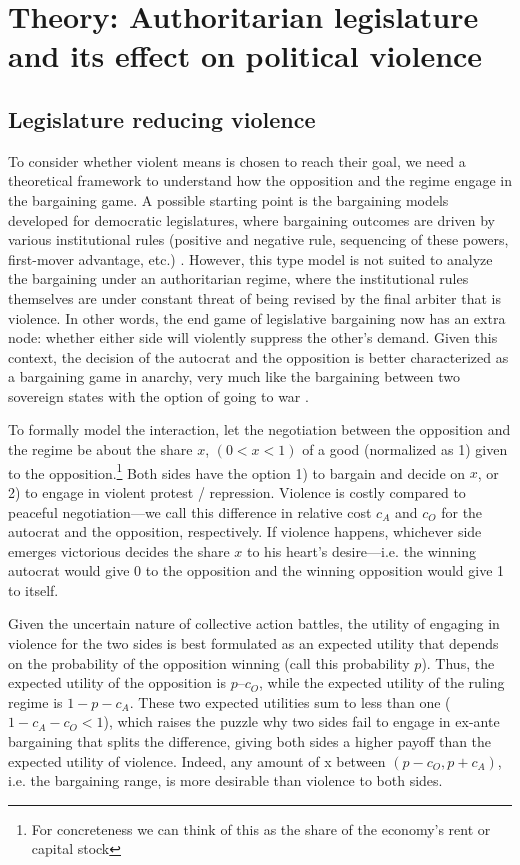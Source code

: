 \section{Theory: Authoritarian legislature and its effect on political violence}
\label{sec:theory}

\subsection{Legislature reducing violence}

To consider whether violent means is chosen to reach their goal, we need a theoretical framework to understand how the opposition and the regime engage in the bargaining game. A possible starting point is the bargaining models developed for democratic legislatures, where bargaining outcomes are driven by various institutional rules (positive and negative rule, sequencing of these powers, first-mover advantage, etc.) \citep{Baron1989, Cox2006}. However, this type model is not suited to analyze the bargaining under an authoritarian regime, where the institutional rules themselves are under constant threat of being revised by the final arbiter that is violence. In other words, the end game of legislative bargaining now has an extra node: whether either side will violently suppress the other’s demand. Given this context, the decision of the autocrat and the opposition is better characterized as a bargaining game in anarchy, very much like the bargaining between two sovereign states with the option of going to war \citep{Fearon1995}.

To formally model the interaction, let the negotiation between the opposition and the regime be about the share $x$, $(0 < x < 1)$ of a good (normalized as 1) given to the opposition.\footnote{For concreteness we can think of this as the share of the economy’s rent or capital stock} Both sides have the option 1) to bargain and decide on $x$, or 2) to engage in violent protest / repression. Violence is costly compared to peaceful negotiation---we call this difference in relative cost $c_A$ and $c_O$ for the autocrat and the opposition, respectively. If violence happens, whichever side emerges victorious decides the share $x$ to his heart’s desire---i.e. the winning autocrat would give 0 to the opposition and the winning opposition would give 1 to itself.

Given the uncertain nature of collective action battles, the utility of engaging in violence for the two sides is best formulated as an expected utility that depends on the probability of the opposition winning (call this probability $p$). Thus, the expected utility of the opposition is $p – c_O$, while the expected utility of the ruling regime is $1 - p - c_A$. These two expected utilities sum to less than one ($1 - c_A - c_O < 1$), which raises the puzzle why two sides fail to engage in ex-ante bargaining that splits the difference, giving both sides a higher payoff than the expected utility of violence. Indeed, any amount of x between $(p - c_O, p + c_A)$, i.e. the bargaining range, is more desirable than violence to both sides.

